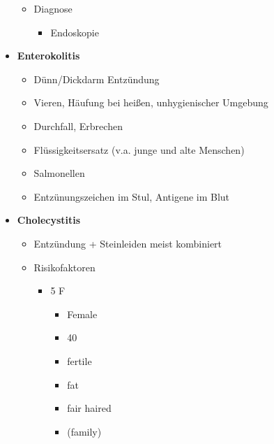 \begin{itemize}
\begin{itemize}
					\item Diagnose
						\begin{itemize}
							\item Endoskopie
						\end{itemize}
				\end{itemize}
			\item \textbf{Enterokolitis}
				\begin{itemize}
					\item Dünn/Dickdarm Entzündung
					\item Vieren, Häufung bei heißen, unhygienischer Umgebung
					\item Durchfall, Erbrechen
					\item Flüssigkeitsersatz (v.a. junge und alte Menschen)
					\item Salmonellen
					\item Entzünungszeichen im Stul, Antigene im Blut
				\end{itemize}
			\item \textbf{Cholecystitis}
				\begin{itemize}
					\item Entzündung + Steinleiden meist kombiniert
					\item Risikofaktoren
						\begin{itemize}
							\item 5 F
								\begin{itemize}
									\item Female
									\item 40
									\item fertile
									\item fat
									\item fair haired
									\item (family)
								\end{itemize}
									

\end{itemize}
\end{itemize}
\end{itemize}
